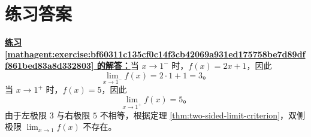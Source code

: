 \documentclass[UTF8,fontset=fandol,11pt]{ctexart}
\begin{document}
\section*{练习答案}
\par\noindent\textbf{\hyperref[mathagent:exercise:bf60311c135cf0c14f3cb42069a931ed175758be7d89dff861bed83a8d332803]{练习 \ref*{mathagent:exercise:bf60311c135cf0c14f3cb42069a931ed175758be7d89dff861bed83a8d332803} 的解答：}}当 $x\to1^-$ 时，$f(x)=2x+1$，因此
\[
\lim_{x\to1^-}f(x)=2\cdot1+1=3\text{。}
\]
当 $x\to1^+$ 时，$f(x)=5$，因此
\[
\lim_{x\to1^+}f(x)=5\text{。}
\]
由于左极限 $3$ 与右极限 $5$ 不相等，根据定理 \ref{thm:two-sided-limit-criterion}，双侧极限 $\lim_{x\to1}f(x)$ 不存在。\par
\end{document}
